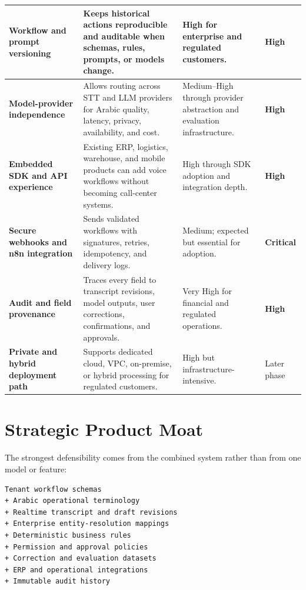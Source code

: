 \documentclass[10.5pt,a4paper]{article}
\begin{document}
\begin{longtable}{L{42mm}L{67mm}L{32mm}L{22mm}}
\textbf{Workflow and prompt versioning}
& Keeps historical actions reproducible and auditable when schemas, rules, prompts, or models change.
& High for enterprise and regulated customers.
& \textbf{High} \\
\midrule

\textbf{Model-provider independence}
& Allows routing across STT and LLM providers for Arabic quality, latency, privacy, availability, and cost.
& Medium--High through provider abstraction and evaluation infrastructure.
& \textbf{High} \\
\midrule

\textbf{Embedded SDK and API experience}
& Existing ERP, logistics, warehouse, and mobile products can add voice workflows without becoming call-center systems.
& High through SDK adoption and integration depth.
& \textbf{High} \\
\midrule

\textbf{Secure webhooks and n8n integration}
& Sends validated workflows with signatures, retries, idempotency, and delivery logs.
& Medium; expected but essential for adoption.
& \textbf{Critical} \\
\midrule

\textbf{Audit and field provenance}
& Traces every field to transcript revisions, model outputs, user corrections, confirmations, and approvals.
& Very High for financial and regulated operations.
& \textbf{High} \\
\midrule

\textbf{Private and hybrid deployment path}
& Supports dedicated cloud, VPC, on-premise, or hybrid processing for regulated customers.
& High but infrastructure-intensive.
& Later phase \\

\bottomrule
\end{longtable}
\normalsize

\section{Strategic Product Moat}

The strongest defensibility comes from the combined system rather than
from one model or feature:

\begin{lstlisting}
Tenant workflow schemas
+ Arabic operational terminology
+ Realtime transcript and draft revisions
+ Enterprise entity-resolution mappings
+ Deterministic business rules
+ Permission and approval policies
+ Correction and evaluation datasets
+ ERP and operational integrations
+ Immutable audit history
\end{lstlisting}
\end{document}
